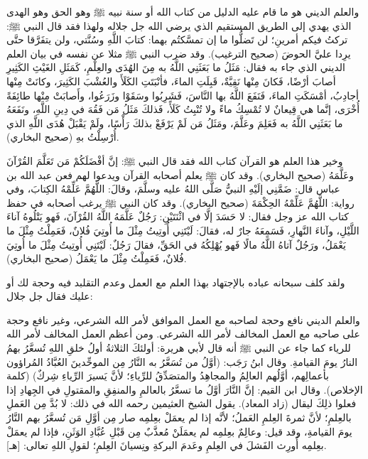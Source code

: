 والعلم الديني هو ما قام عليه الدليل من كتاب الله أو سنة نبيه ﷺ وهو الحق وهو الهدى الذي يهدي إلى الطريق المستقيم الذي يرضي الله جل جلاله ولهذا فقد قال النبي ﷺ: تركتُ فيكم أمرينِ؛ لن تَضلُّوا ما إن تمسَّكتُم بهما: كتابَ اللَّهِ وسُنَّتي، ولن يتفَرَّقا حتَّى يرِدا عليَّ الحوضَ {\footnotesize (صحيح الترغيب)}. وقد ضرب النبي ﷺ مثلا عن نفسه في بيان العلم الديني الذي جاء به فقال: مَثَلُ ما بَعَثَنِي اللَّهُ به مِنَ الهُدَى والعِلْمِ، كَمَثَلِ الغَيْثِ الكَثِيرِ أصابَ أرْضًا، فَكانَ مِنْها نَقِيَّةٌ، قَبِلَتِ الماءَ، فأنْبَتَتِ الكَلَأَ والعُشْبَ الكَثِيرَ، وكانَتْ مِنْها أجادِبُ، أمْسَكَتِ الماءَ، فَنَفَعَ اللَّهُ بها النَّاسَ، فَشَرِبُوا وسَقَوْا وزَرَعُوا، وأَصابَتْ مِنْها طائِفَةً أُخْرَى، إنَّما هي قِيعانٌ لا تُمْسِكُ ماءً ولا تُنْبِتُ كَلَأً، فَذلكَ مَثَلُ مَن فَقُهَ في دِينِ اللَّهِ، ونَفَعَهُ ما بَعَثَنِي اللَّهُ به فَعَلِمَ وعَلَّمَ، ومَثَلُ مَن لَمْ يَرْفَعْ بذلكَ رَأْسًا، ولَمْ يَقْبَلْ هُدَى اللَّهِ الذي أُرْسِلْتُ بهِ {\footnotesize (صحيح البخاري)}.

 وخير هذا العلم هو القرآن كتاب الله فقد قال النبي ﷺ: إنَّ أفْضَلَكُمْ مَن تَعَلَّمَ القُرْآنَ وعَلَّمَهُ {\footnotesize (صحيح البخاري)}. وقد كان ﷺ يعلم أصحابه القرآن ويدعوا لهم فعن عبد الله بن عباس قال: ضَمَّنِي إلَيْهِ النبيُّ صَلَّى اللهُ عليه وسلَّمَ، وقالَ: اللَّهُمَّ عَلِّمْهُ الكِتابَ، وفي رواية: اللَّهُمَّ عَلِّمْهُ الحِكْمَةَ {\footnotesize (صحيح البخاري)}. وقد كان النبي ﷺ يرغب أصحابه في حفظ كتاب الله عز وجل فقال: لا حَسَدَ إلَّا في اثْنَتَيْنِ: رَجُلٌ عَلَّمَهُ اللَّهُ القُرْآنَ، فَهو يَتْلُوهُ آناءَ اللَّيْلِ، وآناءَ النَّهارِ، فَسَمِعَهُ جارٌ له، فقالَ: لَيْتَنِي أُوتِيتُ مِثْلَ ما أُوتِيَ فُلانٌ، فَعَمِلْتُ مِثْلَ ما يَعْمَلُ، ورَجُلٌ آتاهُ اللَّهُ مالًا فَهو يُهْلِكُهُ في الحَقِّ، فقالَ رَجُلٌ: لَيْتَنِي أُوتِيتُ مِثْلَ ما أُوتِيَ فُلانٌ، فَعَمِلْتُ مِثْلَ ما يَعْمَلُ {\footnotesize (صحيح البخاري)}.

ولقد كلف سبحانه عباده بالإجتهاد بهذا العلم مع العمل 
\quranayah*[4][135][1-9]{\footnotesize \surahname*[4]}
\quranayah*[5][8][1-9]{\footnotesize \surahname*[5]}
وعدم التقلبد فيه وحجة لك أو عليك فقال جل جلال: 
\quranayah*[33][67]{\footnotesize \surahname*[33]}

والعلم الديني نافع وحجة لصاحبه مع العمل الموافق لأمر الله الشرعي، وغير نافع وحجة على صاحبه مع العمل المخالف لأمر الله الشرعي. ومن أعظم العمل المخالف لأمر الله للرياء كما جاء عن النبي ﷺ أنه قال لأبي هريرة: أولئكَ الثلاثةُ أولُ خلقِ اللهِ تُسعَّرُ بهمُ النارُ يومَ القيامةِ. وقال ابنُ رَجَب: (أوَّلُ من تُسَعَّرُ به النَّارُ مِن الموحِّدينَ العُبَّادُ المُراؤون بأعمالِهم، أوَّلُهم العالِمُ والمجاهِدُ والمتصَدِّقُ للرِّياءِ؛ لأنَّ يَسيرَ الرِّياءِ شِركٌ) {\footnotesize (كلمة الإخلاص)}. وقال ابن القيم: إنَّ النَّارَ أوَّلُ ما تسعَّرُ بالعالمِ والمنفِقِ والمقتولِ في الجِهادِ إذا فعلوا ذلِكَ ليقال {\footnotesize (زاد المعاد)}. يقول الشيخ العثيمين رحمه الله في ذلك: لا بُدَّ مِن العَملِ بالعِلمِ؛ لأنَّ ثمرةَ العِلمِ العَملُ؛ لأنَّه إذا لم يعمَلْ بعِلمِه صار مِن أوَّلِ مَن تُسعَّرُ بهم النَّارُ يومَ القيامةِ، وقد قيل: وعالِمٌ بعِلمِه لم يعمَلَنْ مُعذَّبٌ مِن قَبْلِ عُبَّادِ الوَثَنِ، فإذا لم يعمَلْ بعِلمِه أُورِث الفَشلَ في العِلمِ وعَدمَ البركةِ ونِسيانَ العِلمِ؛ لقولِ اللهِ تعالى:
\quranayah*[5][13]{\footnotesize \surahname*[13]} [هـ].

